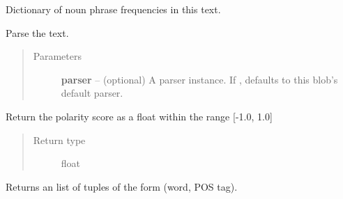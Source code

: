 \documentclass[letterpaper,10pt,english]{sphinxmanual}
\begin{document}
\begin{fulllineitems}

\begin{fulllineitems}
\label{api_reference:textblob_de.blob.BaseBlob.np_counts}
Dictionary of noun phrase frequencies in this text.

\end{fulllineitems}


\begin{fulllineitems}
\label{api_reference:textblob_de.blob.BaseBlob.parse}
Parse the text.
\begin{quote}\begin{description}
\item[{Parameters}] \leavevmode
\textbf{parser} -- (optional) A parser instance. If , defaults to
this blob's default parser.

\end{description}\end{quote}


\end{fulllineitems}


\begin{fulllineitems}
\label{api_reference:textblob_de.blob.BaseBlob.polarity}
Return the polarity score as a float within the range {[}-1.0, 1.0{]}
\begin{quote}\begin{description}
\item[{Return type}] \leavevmode
float

\end{description}\end{quote}

\end{fulllineitems}


\begin{fulllineitems}
\label{api_reference:textblob_de.blob.BaseBlob.pos_tags}
Returns an list of tuples of the form (word, POS tag).


\end{fulllineitems}
\end{fulllineitems}
\end{document}
